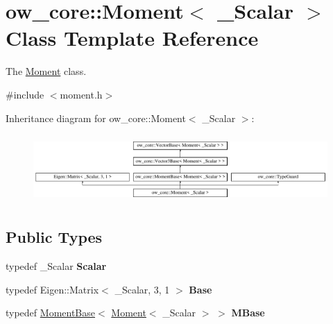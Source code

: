 \hypertarget{classow__core_1_1Moment}{}\section{ow\+\_\+core\+:\+:Moment$<$ \+\_\+\+Scalar $>$ Class Template Reference}
\label{classow__core_1_1Moment}


The \hyperlink{classow__core_1_1Moment}{Moment} class.  




{\ttfamily \#include $<$moment.\+h$>$}

Inheritance diagram for ow\+\_\+core\+:\+:Moment$<$ \+\_\+\+Scalar $>$\+:\begin{figure}[H]
\begin{center}
\leavevmode
\includegraphics[height=2.629108cm]{da/d30/classow__core_1_1Moment}
\end{center}
\end{figure}
\subsection*{Public Types}
\begin{DoxyCompactItemize}
\item 
typedef \+\_\+\+Scalar {\bfseries Scalar}\hypertarget{classow__core_1_1Moment_a1b7a49145338008bf7346342cdda0549}{}\label{classow__core_1_1Moment_a1b7a49145338008bf7346342cdda0549}

\item 
typedef Eigen\+::\+Matrix$<$ \+\_\+\+Scalar, 3, 1 $>$ {\bfseries Base}\hypertarget{classow__core_1_1Moment_ae92aa821ba0db11a620482822fd949ef}{}\label{classow__core_1_1Moment_ae92aa821ba0db11a620482822fd949ef}

\item 
typedef \hyperlink{classow__core_1_1MomentBase}{Moment\+Base}$<$ \hyperlink{classow__core_1_1Moment}{Moment}$<$ \+\_\+\+Scalar $>$ $>$ {\bfseries M\+Base}\hypertarget{classow__core_1_1Moment_a6ebd391cffaa0f2433d76af2db448b32}{}\label{classow__core_1_1Moment_a6ebd391cffaa0f2433d76af2db448b32}

\end{DoxyCompactItemize}
